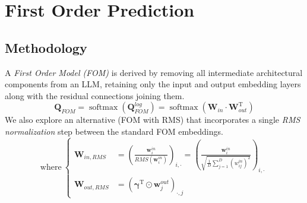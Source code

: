 \documentclass[aspectratio=169, 12pt]{beamer}
\newcommand{\gbm}[1]{\bm{\mathbf{#1}}} %
\newcommand{\T}{\mathrm{T}} %
\begin{document}
    \section{First Order Prediction}

    \subsection{Methodology}
    \begin{frame}{}
        A \emph{First Order Model (FOM)} is derived by removing all intermediate architectural components from an LLM, retaining only the input and output embedding layers along with the residual connections joining them.
        \begin{equation*}
            \gbm{Q}_{\textit{FOM}} = \operatorname{softmax}(\gbm{Q}_{\textit{FOM}}^{log}) = \operatorname{softmax}(\gbm{W}_{in} \cdot \gbm{W}_{out}^\T)
        \end{equation*}
        We also explore an alternative (FOM with RMS) that incorporates a single \emph{RMS normalization} step between the standard FOM embeddings.
        \begin{equation*}
            \text{where}\ \left\{
                \begin{array}{cl}
                    \gbm{W}_{in,RMS} &= \left(\frac{\gbm{w}_i^{in}}{RMS(\gbm{w}_i^{in})}\right)_{i,\cdot} = \left(\frac{\gbm{w}_i^{in}}{\sqrt{\frac{1}{D}\sum_{j=1}^{D}{(w_{ij}^{in})^2}}}\right)_{i,\cdot} \\
                    \gbm{W}_{out,RMS} &= \left(\gbm{\gamma}^\T \odot \gbm{w}_j^{out}\right)_{\cdot,j}
                \end{array}
            \right.
        \end{equation*}
    \end{frame}

\end{document}
